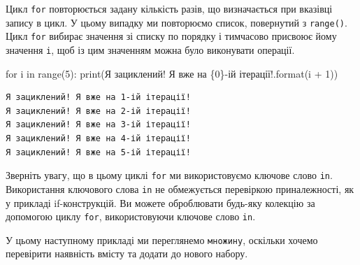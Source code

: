 \documentclass[
  letterpaper,
]{report}
\newenvironment{Shaded}{\begin{snugshade}}{\end{snugshade}}
\newcommand{\BuiltInTok}[1]{\textcolor[rgb]{0.00,0.23,0.31}{#1}}
\newcommand{\ControlFlowTok}[1]{\textcolor[rgb]{0.00,0.23,0.31}{#1}}
\newcommand{\DecValTok}[1]{\textcolor[rgb]{0.68,0.00,0.00}{#1}}
\newcommand{\KeywordTok}[1]{\textcolor[rgb]{0.00,0.23,0.31}{#1}}
\newcommand{\NormalTok}[1]{\textcolor[rgb]{0.00,0.23,0.31}{#1}}
\newcommand{\OperatorTok}[1]{\textcolor[rgb]{0.37,0.37,0.37}{#1}}
\newcommand{\SpecialCharTok}[1]{\textcolor[rgb]{0.37,0.37,0.37}{#1}}
\newcommand{\StringTok}[1]{\textcolor[rgb]{0.13,0.47,0.30}{#1}}
\begin{document}
Цикл \texttt{for} повторюється задану кількість разів, що визначається
при вказівці запису в цикл. У цьому випадку ми повторюємо список,
повернутий з \texttt{range()}. Цикл \texttt{for} вибирає значення зі
списку по порядку і тимчасово присвоює йому значення \texttt{i}, щоб із
цим значенням можна було виконувати операції.

\begin{Shaded}
\begin{Highlighting}[]
\ControlFlowTok{for}\NormalTok{ i }\KeywordTok{in} \BuiltInTok{range}\NormalTok{(}\DecValTok{5}\NormalTok{):}
    \BuiltInTok{print}\NormalTok{(}\StringTok{\textquotesingle{}Я зациклений! Я вже на }\SpecialCharTok{\{0\}}\StringTok{{-}ій ітерації!\textquotesingle{}}\NormalTok{.}\BuiltInTok{format}\NormalTok{(i }\OperatorTok{+} \DecValTok{1}\NormalTok{))}
\end{Highlighting}
\end{Shaded}

\begin{verbatim}
Я зациклений! Я вже на 1-ій ітерації!
Я зациклений! Я вже на 2-ій ітерації!
Я зациклений! Я вже на 3-ій ітерації!
Я зациклений! Я вже на 4-ій ітерації!
Я зациклений! Я вже на 5-ій ітерації!
\end{verbatim}

Зверніть увагу, що в цьому циклі \texttt{for} ми використовуємо ключове
слово \texttt{in}. Використання ключового слова \texttt{in} не
обмежується перевіркою приналежності, як у прикладі if-конструкцій. Ви
можете оброблювати будь-яку колекцію за допомогою циклу \texttt{for},
використовуючи ключове слово \texttt{in}.

У цьому наступному прикладі ми переглянемо \texttt{множину}, оскільки
хочемо перевірити наявність вмісту та додати до нового набору.
\end{document}
